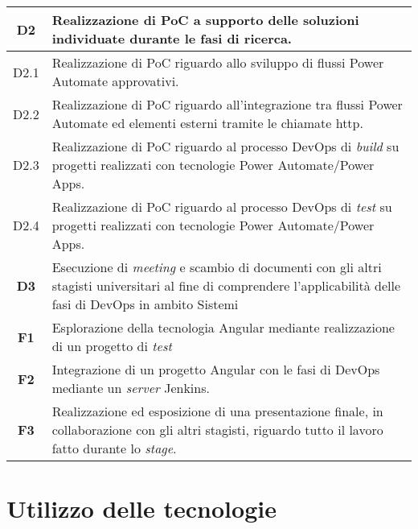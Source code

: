 \begin{longtable}{|c|p{11cm}|}
\hline \textbf{D2}  & Realizzazione di PoC a supporto delle soluzioni individuate durante le fasi di ricerca.\\
\hline D2.1  & Realizzazione di PoC riguardo allo sviluppo di flussi Power Automate approvativi.\\
\hline D2.2  & Realizzazione di PoC riguardo all'integrazione tra flussi Power Automate ed elementi esterni tramite le chiamate \gls{http}.\\
\hline D2.3  & Realizzazione di PoC riguardo al processo \gls{DevOps} di \emph{build} su progetti realizzati con tecnologie Power Automate/Power Apps.\\
\hline D2.4  & Realizzazione di PoC riguardo al processo \gls{DevOps} di \emph{test} su progetti realizzati con tecnologie Power Automate/Power Apps.\\
\hline \textbf{D3}  & Esecuzione di \emph{meeting} e scambio di documenti con gli altri stagisti universitari al fine di comprendere l'applicabilità delle fasi di \gls{DevOps} in ambito \gls{Sistemi} \\
\hline 
\hline \textbf{F1}  & Esplorazione della tecnologia Angular mediante realizzazione di un progetto di \emph{test}\\
\hline \textbf{F2}  & Integrazione di un progetto Angular con le fasi di \gls{DevOps} mediante un \emph{server} Jenkins.\\
\hline \textbf{F3}  & Realizzazione ed esposizione di una presentazione finale, in collaborazione con gli altri stagisti, riguardo tutto il lavoro fatto durante lo \emph{stage}.\\
\end{longtable}

\section{Utilizzo delle tecnologie}%
